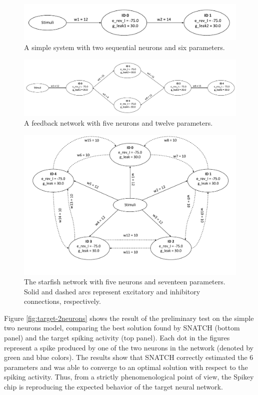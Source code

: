 \documentclass[utf8]{frontiersFPHY} %
\newcommand {\name}{SNATCH}
\begin{document}
\begin{figure}[!ht]
	\centering
	\includegraphics[width=.6\textwidth]{images/topologies/2_neurons_topology.pdf}
	\caption{A simple system with two sequential neurons and six parameters.}
	\label{fig:topology-2neurons}
\end{figure}
\begin{figure}[tb]
	\centering
	\includegraphics[width=\textwidth]{images/topologies/ring_topology.pdf}
	\caption{A feedback network with five neurons and twelve parameters.}
	\label{fig:topology-feedback}
\end{figure}
\begin{figure}[tb]
	\centering
	\includegraphics[width=.7\textwidth]{images/topologies/starfish_topology.pdf}
	\caption{The starfish network with five neurons and seventeen parameters. Solid and dashed arcs represent excitatory and inhibitory connections, respectively.}
	\label{fig:topology-starfish}
\end{figure}



Figure \ref{fig:target-2neurons} shows the result of the preliminary test on the simple two neurons model, comparing the best solution found by \name{} (bottom panel) and the target spiking activity (top panel).
Each dot in the figures represent a spike produced by one of the two neurons in the network (denoted by green and blue colors).
The results show that \name{} correctly estimated  the 6 parameters and was able to converge to an optimal solution with respect to the spiking activity.
Thus, from a strictly phenomenological point of view, the Spikey chip is reproducing the expected behavior of the target neural network.
\end{document}
